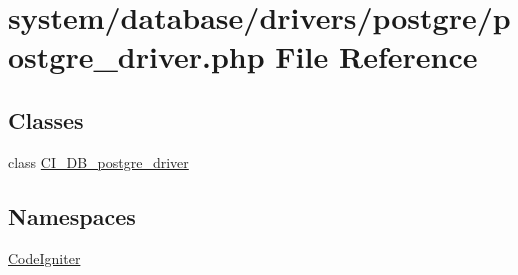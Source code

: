 \hypertarget{postgre__driver_8php}{}\section{system/database/drivers/postgre/postgre\+\_\+driver.php File Reference}
\label{postgre__driver_8php}
\subsection*{Classes}
\begin{DoxyCompactItemize}
\item 
class \mbox{\hyperlink{class_c_i___d_b__postgre__driver}{C\+I\+\_\+\+D\+B\+\_\+postgre\+\_\+driver}}
\end{DoxyCompactItemize}
\subsection*{Namespaces}
\begin{DoxyCompactItemize}
\item 
 \mbox{\hyperlink{namespace_code_igniter}{Code\+Igniter}}
\end{DoxyCompactItemize}
